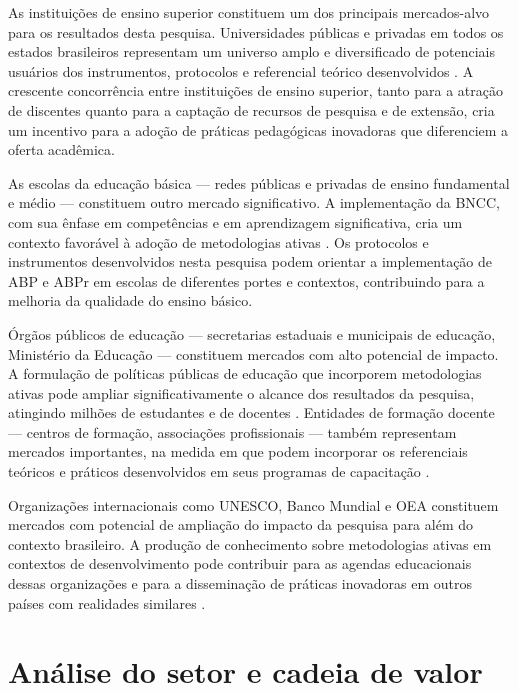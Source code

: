 As instituições de ensino superior constituem um dos principais mercados-alvo para os resultados desta pesquisa. Universidades públicas e privadas em todos os estados brasileiros representam um universo amplo e diversificado de potenciais usuários dos instrumentos, protocolos e referencial teórico desenvolvidos \cite{VEIGA2014}. A crescente concorrência entre instituições de ensino superior, tanto para a atração de discentes quanto para a captação de recursos de pesquisa e de extensão, cria um incentivo para a adoção de práticas pedagógicas inovadoras que diferenciem a oferta acadêmica.

As escolas da educação básica — redes públicas e privadas de ensino fundamental e médio — constituem outro mercado significativo. A implementação da BNCC, com sua ênfase em competências e em aprendizagem significativa, cria um contexto favorável à adoção de metodologias ativas \cite{BRASIL2018}. Os protocolos e instrumentos desenvolvidos nesta pesquisa podem orientar a implementação de ABP e ABPr em escolas de diferentes portes e contextos, contribuindo para a melhoria da qualidade do ensino básico.

Órgãos públicos de educação — secretarias estaduais e municipais de educação, Ministério da Educação — constituem mercados com alto potencial de impacto. A formulação de políticas públicas de educação que incorporem metodologias ativas pode ampliar significativamente o alcance dos resultados da pesquisa, atingindo milhões de estudantes e de docentes \cite{MACHADO2025}. Entidades de formação docente — centros de formação, associações profissionais — também representam mercados importantes, na medida em que podem incorporar os referenciais teóricos e práticos desenvolvidos em seus programas de capacitação \cite{CANTANHEDE2026}.

Organizações internacionais como UNESCO, Banco Mundial e OEA constituem mercados com potencial de ampliação do impacto da pesquisa para além do contexto brasileiro. A produção de conhecimento sobre metodologias ativas em contextos de desenvolvimento pode contribuir para as agendas educacionais dessas organizações e para a disseminação de práticas inovadoras em outros países com realidades similares \cite{OECD2023}.

\section{Análise do setor e cadeia de valor}
\label{sec:setor_cadeia}


